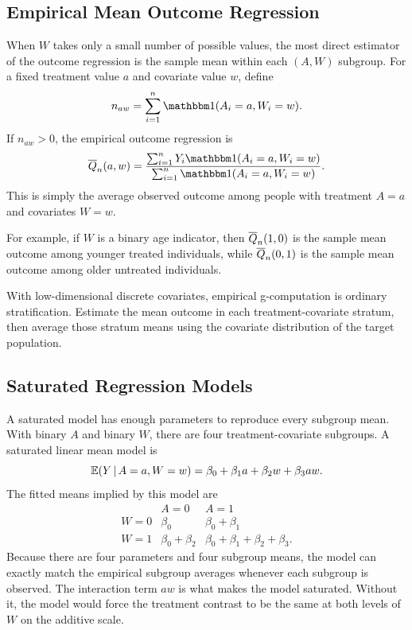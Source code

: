 \label{lec:4-2}

\subsection{Empirical Mean Outcome Regression}

When $W$ takes only a small number of possible values, the most direct estimator of
the outcome regression is the sample mean within each $(A,W)$ subgroup. For a fixed
treatment value $a$ and covariate value $w$, define
\[
n_{aw}=\sum_{i=1}^n \ind(A_i=a,W_i=w).
\]
If $n_{aw}>0$, the empirical outcome regression is
\[
\Qbar_n(a,w)
=
\frac{\sum_{i=1}^n Y_i\ind(A_i=a,W_i=w)}
       {\sum_{i=1}^n \ind(A_i=a,W_i=w)}.
\]
This is simply the average observed outcome among people with treatment $A=a$ and
covariates $W=w$.

For example, if $W$ is a binary age indicator, then $\overline{Q}_n(1,0)$ is the sample mean
outcome among younger treated individuals, while $\overline{Q}_n(0,1)$ is the sample mean
outcome among older untreated individuals.

\begin{keyidea}
With low-dimensional discrete covariates, empirical g-computation is ordinary
stratification. Estimate the mean outcome in each treatment-covariate stratum, then
average those stratum means using the covariate distribution of the target population.
\end{keyidea}

\subsection{Saturated Regression Models}

A saturated model has enough parameters to reproduce every subgroup mean. With
binary $A$ and binary $W$, there are four treatment-covariate subgroups. A saturated
linear mean model is
\[
\mathbb{E}(Y\,\vert\, A=a,W=w)=\beta_0+\beta_1 a+\beta_2 w+\beta_3 aw.
\]
The fitted means implied by this model are
\[
\begin{array}{c|cc}
& A=0 & A=1\\
\hline
W=0 & \beta_0 & \beta_0+\beta_1\\
W=1 & \beta_0+\beta_2 & \beta_0+\beta_1+\beta_2+\beta_3 .
\end{array}
\]
Because there are four parameters and four subgroup means, the model can exactly
match the empirical subgroup averages whenever each subgroup is observed. The
interaction term $aw$ is what makes the model saturated. Without it, the model would
force the treatment contrast to be the same at both levels of $W$ on the additive
scale.

